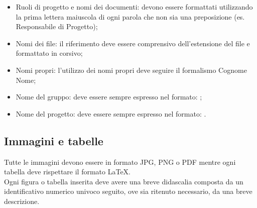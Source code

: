 {{			\begin{itemize}
				\item Ruoli di progetto e nomi dei documenti: devono essere formattati utilizzando la prima lettera maiuscola di ogni parola che non sia una preposizione (es. Responsabile di Progetto);
				\item Nomi dei file: il riferimento deve essere comprensivo dell’estensione del file e formattato in corsivo;
				\item Nomi propri: l’utilizzo dei nomi propri deve seguire il formalismo Cognome Nome;
				\item Nome del gruppo: deve essere sempre espresso nel formato: \gruppo;
				\item Nome del progetto: deve essere sempre espresso nel formato: \premi.
			\end{itemize}
			}
		\subsection{Immagini e tabelle}{
			\label{sub:img}
			Tutte le immagini devono essere in formato JPG, PNG o PDF mentre ogni tabella deve rispettare il formato \LaTeX.\\
			Ogni figura o tabella inserita deve avere una breve didascalia composta da un identificativo numerico univoco seguito, ove sia ritenuto necessario, da una breve descrizione.
			
			}

		}